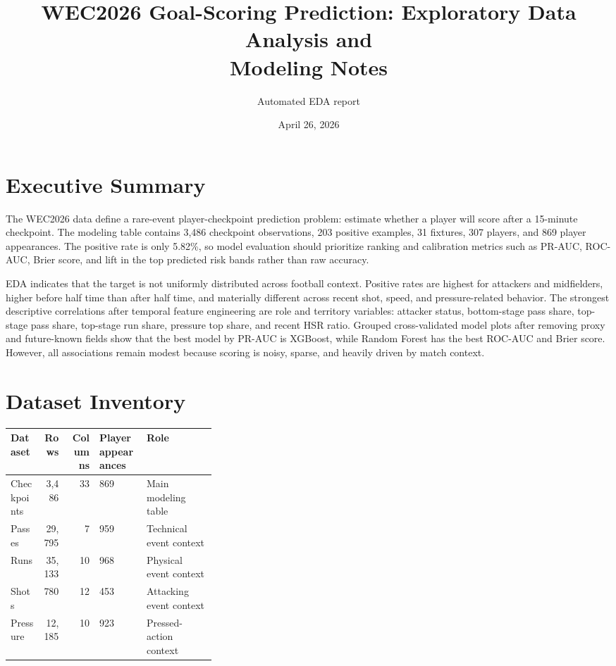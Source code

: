 \documentclass[11pt]{article}
\title{WEC2026 Goal-Scoring Prediction: Exploratory Data Analysis and\\Modeling Notes}
\author{Automated EDA report}
\date{April 26, 2026}
\begin{document}
\maketitle

\section{Executive Summary}
The WEC2026 data define a rare-event player-checkpoint prediction problem: estimate whether a player will score after a 15-minute checkpoint.
The modeling table contains 3,486 checkpoint observations, 203 positive examples, 31 fixtures, 307 players, and 869 player appearances.
The positive rate is only 5.82\%, so model evaluation should prioritize ranking and calibration metrics such as PR-AUC, ROC-AUC, Brier score, and lift in the top predicted risk bands rather than raw accuracy.

EDA indicates that the target is not uniformly distributed across football context.
Positive rates are highest for attackers and midfielders, higher before half time than after half time, and materially different across recent shot, speed, and pressure-related behavior.
The strongest descriptive correlations after temporal feature engineering are role and territory variables: attacker status, bottom-stage pass share, top-stage pass share, top-stage run share, pressure top share, and recent HSR ratio.
Grouped cross-validated model plots after removing proxy and future-known fields show that the best model by PR-AUC is XGBoost, while Random Forest has the best ROC-AUC and Brier score.
However, all associations remain modest because scoring is noisy, sparse, and heavily driven by match context.

\section{Dataset Inventory}
\begin{longtable}{lrrlp{0.34\linewidth}}
\toprule
Dataset & Rows & Columns & Player appearances & Role \\
\midrule
Checkpoints & 3,486 & 33 & 869 & Main modeling table \\
Passes & 29,795 & 7 & 959 & Technical event context \\
Runs & 35,133 & 10 & 968 & Physical event context \\
Shots & 780 & 12 & 453 & Attacking event context \\
Pressure & 12,185 & 10 & 923 & Pressed-action context \\
\bottomrule
\end{longtable}
\end{document}
